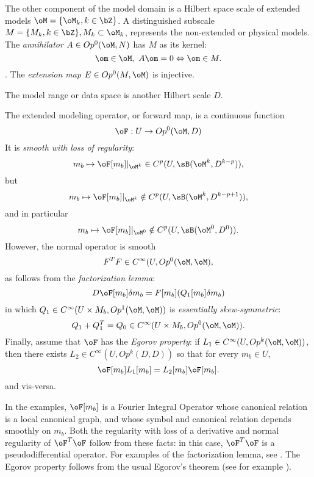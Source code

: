 The other component of the model domain is a Hilbert space scale of extended
models $\oM =\{\oM_k, k\in \bZ\}$. 
A distinguished subscale $M = \{M_k, k\in \bZ\}, M_k \subset \oM_k$,
represents the non-extended or physical models. 
The  {\em annihilator} $A \in Op^0(\oM,N)$ has $M$ as its kernel:
\begin{equation}
\label{eqn:ann}
\om \in \oM,\,\,A\om=0 \Leftrightarrow \om \in M.
\end{equation}.
The {\em extension map} $E \in Op^0(M,\oM)$ is injective.

The model range or data space is another Hilbert scale $D$.

The extended modeling operator, or forward map, is a continuous function
\[
\oF: U \rightarrow Op^0(\oM,D)
\]
It is {\em smooth with loss of regularity}: 
\begin{equation}
\label{eqn:nonsmooth1} 
m_b \mapsto \oF[m_b]|_{\oM^k} \in C^p(U,\sB(\oM^k,D^{k-p})),
\end{equation}
but
\begin{equation}
\label{eqn:nonsmooth2} 
m_b \mapsto \oF[m_b]|_{\oM^k} \notin C^p(U,\sB(\oM^k,D^{k-p+1})),
\end{equation}
and in particular
\begin{equation}
\label{eqn:nonsmooth3} 
m_b \mapsto \oF[m_b]|_{\oM^0} \notin C^p(U,\sB(\oM^0,D^0)). 
\end{equation}
However, the normal operator is smooth 
\begin{equation}
\label{eqn:smoothnormal}
F^TF \in C^{\infty}(U,Op^0(\oM,\oM),
\end{equation}
as follows from the
{\em factorization lemma}:
\begin{equation}
\label{eqn:factor}
D\oF[m_b] \delta m_b = F[m_b](Q_1[m_b]\delta m_b)
\end{equation}
in which $Q_1 \in C^{\infty}(U\times M_b,Op^1(\oM,\oM))$ is {\em essentially
  skew-symmetric}:
\begin{equation}
\label{eqn:skew}
Q_1 + Q_1^T = Q_0 \in C^{\infty}(U\times M_b,Op^0(\oM,\oM)).
\end{equation}
Finally, assume that $\oF$ has the {\em Egorov property}: if $L_1 \in
C^{\infty}(U,Op^k(\oM,\oM))$, then there exists $L_2 \in
C^{\infty}(U,Op^k(D,D))$ so that for every $m_b \in U$,
\begin{equation}
\label{eqn:egorov}
\oF[m_b] L_1[m_b] = L_2[m_b] \oF[m_b].
\end{equation}
and vis-versa.

 In the examples, $\oF[m_b]$ is a Fourier
Integral Operator whose canonical relation is a local canonical graph,
and whose symbol and canonical relation depends smoothly on $m_b$.
Both the regularity with loss of a derivative
\cite[]{BlazekStolkSymes:13} and normal regularity of $\oF^T\oF$
follow from these facts: in this case, $\oF^T\oF$ is a
pseudodifferential operator. For examples of the factorization lemma,
see \cite{tenKroode:IPTA14,Symes:IPTA14}. The Egorov
property follows from the usual Egorov's theorem (see for example \cite{Tay:81}).

